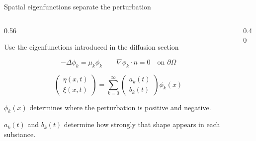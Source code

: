 \begin{frame}{Spatial eigenfunctions separate the perturbation}

  \vspace{-0.08cm}

  \begin{columns}[c,onlytextwidth]

    \begin{column}{0.56\textwidth}
      {\color{HydraMuted}\fontsize{7.8}{9.6}\selectfont
        Use the eigenfunctions introduced in the diffusion section
      \par}

      \vspace{-0.16cm}

      {\color{HydraWhite}\fontsize{10.6}{13.5}\selectfont
      \[
        -\Delta\phi_k=\mu_k\phi_k
        \qquad
        \nabla\phi_k\cdot n=0
        \quad\text{on }\partial\Omega
      \]
      }

      \vspace{-0.18cm}

      {\color{HydraWhite}\fontsize{10.2}{13}\selectfont
      \[
        \begin{pmatrix}
          \eta(x,t)\\
          \xi(x,t)
        \end{pmatrix}
        =
        \sum_{k=0}^{\infty}
        \begin{pmatrix}
          a_k(t)\\
          b_k(t)
        \end{pmatrix}
        \phi_k(x)
      \]
      }

      \vspace{-0.14cm}

        {$\phi_k(x)$ determines where the perturbation is positive and negative.}

      \vspace{-0.06cm}

        {$a_k(t)$ and $b_k(t)$ determine how strongly that shape appears in each substance.}
    \end{column}

    \begin{column}{0.40\textwidth}
      \centering

\end{column}
\end{columns}
\end{frame}
